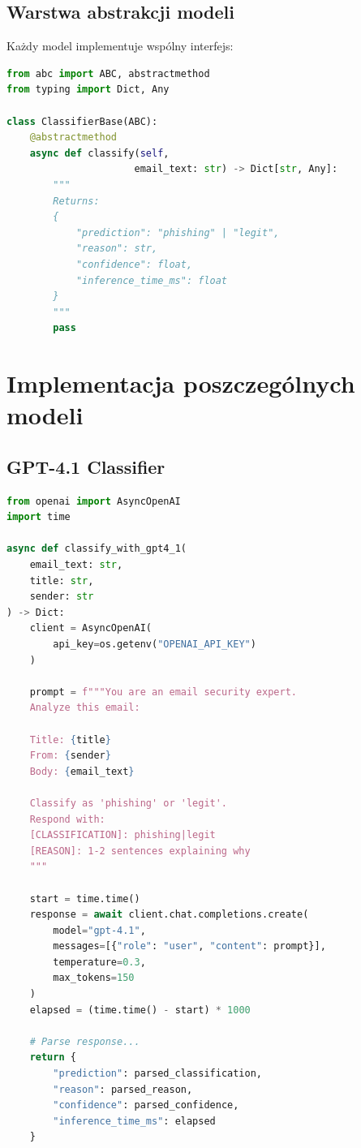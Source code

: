 \documentclass[11pt]{extreport}
\begin{document}
\subsection{Warstwa abstrakcji modeli}

Każdy model implementuje wspólny interfejs:

\begin{lstlisting}[language=Python, caption={Abstrakcja modeli}, label={lst:abstraction}]
from abc import ABC, abstractmethod
from typing import Dict, Any

class ClassifierBase(ABC):
    @abstractmethod
    async def classify(self, 
                      email_text: str) -> Dict[str, Any]:
        """
        Returns:
        {
            "prediction": "phishing" | "legit",
            "reason": str,
            "confidence": float,
            "inference_time_ms": float
        }
        """
        pass
\end{lstlisting}

\section{Implementacja poszczególnych modeli}
\label{sec:impl-modele}

\subsection{GPT-4.1 Classifier}

\begin{lstlisting}[language=Python, caption={Implementacja GPT-4.1}, label={lst:gpt4}]
from openai import AsyncOpenAI
import time

async def classify_with_gpt4_1(
    email_text: str, 
    title: str, 
    sender: str
) -> Dict:
    client = AsyncOpenAI(
        api_key=os.getenv("OPENAI_API_KEY")
    )
    
    prompt = f"""You are an email security expert.
    Analyze this email:
    
    Title: {title}
    From: {sender}
    Body: {email_text}
    
    Classify as 'phishing' or 'legit'.
    Respond with:
    [CLASSIFICATION]: phishing|legit
    [REASON]: 1-2 sentences explaining why
    """
    
    start = time.time()
    response = await client.chat.completions.create(
        model="gpt-4.1",
        messages=[{"role": "user", "content": prompt}],
        temperature=0.3,
        max_tokens=150
    )
    elapsed = (time.time() - start) * 1000
    
    # Parse response...
    return {
        "prediction": parsed_classification,
        "reason": parsed_reason,
        "confidence": parsed_confidence,
        "inference_time_ms": elapsed
    }
\end{lstlisting}
\end{document}
